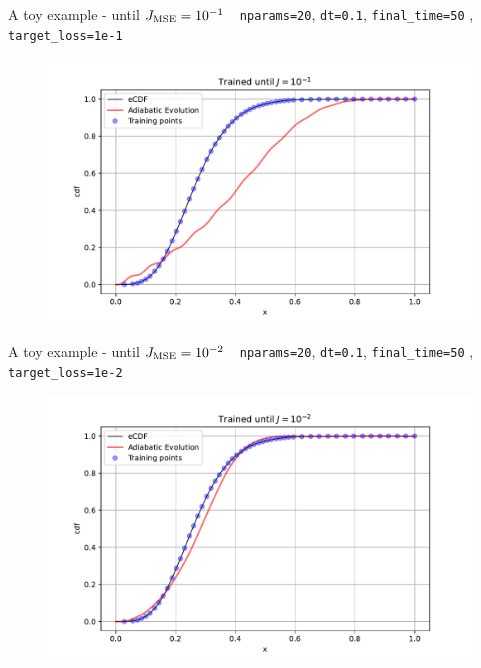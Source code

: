 \documentclass[8pt, xcolor={svgnames}, hyperref={colorlinks, linkcolor=black, citecolor=amethyst, urlcolor=amethyst}]{beamer}
\begin{document}
\begin{frame}[fragile]{A toy example - until $J_{\rm MSE}=10^{-1}$}
\large
\faArrowCircleRight\,\, \texttt{nparams=20}, \texttt{dt=0.1}, \texttt{final\_time=50}
, \texttt{target\_loss=1e-1}
\begin{figure}
    \includegraphics[width=1\textwidth]{figures/ev1.pdf}
\end{figure}
\end{frame}

\begin{frame}[fragile]{A toy example - until $J_{\rm MSE}=10^{-2}$}
\large
\faArrowCircleRight\,\, \texttt{nparams=20}, \texttt{dt=0.1}, \texttt{final\_time=50}
, \texttt{target\_loss=1e-2}
\begin{figure}
    \includegraphics[width=1\textwidth]{figures/ev2.pdf}
\end{figure}
\end{frame}
\end{document}
